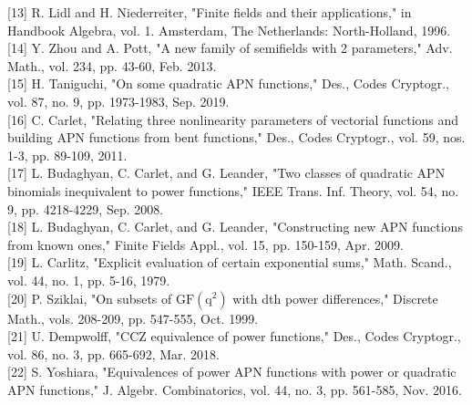 \documentclass[10pt]{article}
\begin{document}
[13] R. Lidl and H. Niederreiter, "Finite fields and their applications," in Handbook Algebra, vol. 1. Amsterdam, The Netherlands: North-Holland, 1996.\\[0pt]
[14] Y. Zhou and A. Pott, "A new family of semifields with 2 parameters," Adv. Math., vol. 234, pp. 43-60, Feb. 2013.\\[0pt]
[15] H. Taniguchi, "On some quadratic APN functions," Des., Codes Cryptogr., vol. 87, no. 9, pp. 1973-1983, Sep. 2019.\\[0pt]
[16] C. Carlet, "Relating three nonlinearity parameters of vectorial functions and building APN functions from bent functions," Des., Codes Cryptogr., vol. 59, nos. 1-3, pp. 89-109, 2011.\\[0pt]
[17] L. Budaghyan, C. Carlet, and G. Leander, "Two classes of quadratic APN binomials inequivalent to power functions," IEEE Trans. Inf. Theory, vol. 54, no. 9, pp. 4218-4229, Sep. 2008.\\[0pt]
[18] L. Budaghyan, C. Carlet, and G. Leander, "Constructing new APN functions from known ones," Finite Fields Appl., vol. 15, pp. 150-159, Apr. 2009.\\[0pt]
[19] L. Carlitz, "Explicit evaluation of certain exponential sums," Math. Scand., vol. 44, no. 1, pp. 5-16, 1979.\\[0pt]
[20] P. Sziklai, "On subsets of $\mathrm{GF}\left(\mathrm{q}^{2}\right)$ with dth power differences," Discrete Math., vols. 208-209, pp. 547-555, Oct. 1999.\\[0pt]
[21] U. Dempwolff, "CCZ equivalence of power functions," Des., Codes Cryptogr., vol. 86, no. 3, pp. 665-692, Mar. 2018.\\[0pt]
[22] S. Yoshiara, "Equivalences of power APN functions with power or quadratic APN functions," J. Algebr. Combinatorics, vol. 44, no. 3, pp. 561-585, Nov. 2016.
\end{document}
